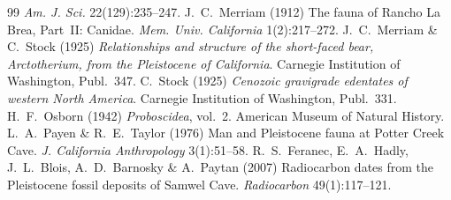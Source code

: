 \documentclass[11pt]{article}
\begin{document}
\begin{thebibliography}{99}
\emph{Am. J. Sci.} 22(129):235--247.
 J.~C.~Merriam (1912) The fauna of Rancho La Brea, Part~II:
Canidae. \emph{Mem. Univ. California} 1(2):217--272.
 J.~C.~Merriam \& C.~Stock (1925) \emph{Relationships and
structure of the short-faced bear, Arctotherium, from the Pleistocene of
California}. Carnegie Institution of Washington, Publ.~347.
 C.~Stock (1925) \emph{Cenozoic gravigrade edentates of western
North America}. Carnegie Institution of Washington, Publ.~331.
 H.~F.~Osborn (1942) \emph{Proboscidea}, vol.~2. American
Museum of Natural History.
 L.~A.~Payen \& R.~E.~Taylor (1976) Man and Pleistocene fauna at
Potter Creek Cave. \emph{J. California Anthropology} 3(1):51--58.
 R.~S.~Feranec, E.~A.~Hadly, J.~L.~Blois, A.~D.~Barnosky \&
A.~Paytan (2007) Radiocarbon dates from the Pleistocene fossil deposits of Samwel
Cave. \emph{Radiocarbon} 49(1):117--121.
\end{thebibliography}
\end{document}
